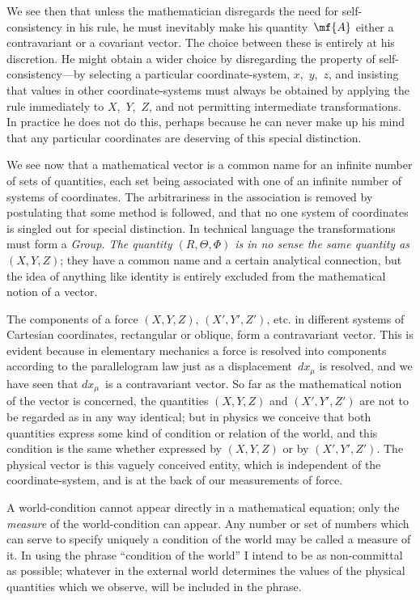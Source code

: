 \documentclass[12pt]{book}
\begin{document}
We see then that unless the mathematician disregards the need for self-consistency
in his rule, he must inevitably make his quantity~$\mf{A}$ either a
contravariant or a covariant vector. The choice between these is entirely at
his discretion. He might obtain a wider choice by disregarding the property
of self-consistency---by selecting a particular coordinate-system, $x$,~$y$,~$z$, and
insisting that values in other coordinate-systems must always be obtained by
applying the rule immediately to $X$,~$Y$,~$Z$, and not permitting intermediate
transformations. In practice he does not do this, perhaps because he can
never make up his mind that any particular coordinates are deserving of this
special distinction.

We see now that a mathematical vector is a common name for an infinite
%
number of sets of quantities, each set being associated with one of an infinite
number of systems of coordinates. The arbitrariness in the association is
removed by postulating that some method is followed, and that no one
system of coordinates is singled out for special distinction. In technical
language the transformations must form a \emph{Group. The quantity $(R, \Theta, \Phi)$
%
is in no sense the same quantity as $(X, Y, Z)$}; they have a common name and
a certain analytical connection, but the idea of anything like identity is
entirely excluded from the mathematical notion of a vector.


The components of a force $(X, Y, Z)$, $(X', Y', Z')$, etc. in different systems
of Cartesian coordinates, rectangular or oblique, form a contravariant vector.
This is evident because in elementary mechanics a force is resolved into
components according to the parallelogram law just as a displacement~$dx_{\mu}$ is
resolved, and we have seen that $dx_{\mu}$~is a contravariant vector. So far as the
mathematical notion of the vector is concerned, the quantities $(X, Y, Z)$ and
$(X', Y', Z')$ are not to be regarded as in any way identical; but in physics
we conceive that both quantities express some kind of condition or relation
of the world, and this condition is the same whether expressed by $(X, Y, Z)$
or by $(X', Y', Z')$. The physical vector is this vaguely conceived entity, which
is independent of the coordinate-system, and is at the back of our measurements
of force.

A world-condition cannot appear directly in a mathematical equation;
only the \emph{measure} of the world-condition can appear. Any number or set of
numbers which can serve to specify uniquely a condition of the world may
%
be called a measure of it. In using the phrase ``condition of the world''
I intend to be as non-committal as possible; whatever in the external world
determines the values of the physical quantities which we observe, will be
included in the phrase.
\end{document}
